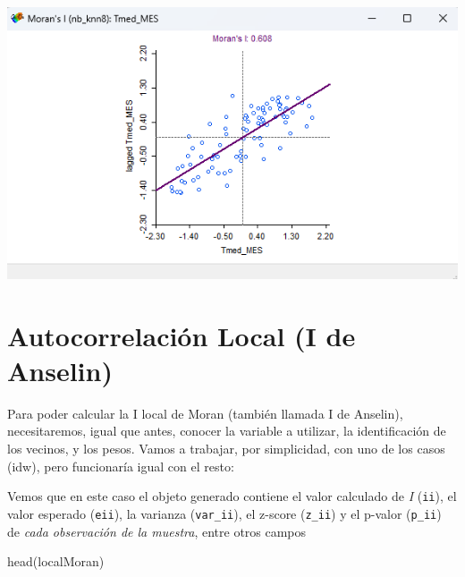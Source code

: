 \documentclass[
  letterpaper,
  DIV=11,
  numbers=noendperiod]{scrreprt}
\newenvironment{Shaded}{\begin{snugshade}}{\end{snugshade}}
\newcommand{\AttributeTok}[1]{\textcolor[rgb]{0.40,0.45,0.13}{#1}}
\newcommand{\FunctionTok}[1]{\textcolor[rgb]{0.28,0.35,0.67}{#1}}
\newcommand{\NormalTok}[1]{\textcolor[rgb]{0.00,0.23,0.31}{#1}}
\newcommand{\OtherTok}[1]{\textcolor[rgb]{0.00,0.23,0.31}{#1}}
\newcommand{\SpecialCharTok}[1]{\textcolor[rgb]{0.37,0.37,0.37}{#1}}
\begin{document}
\includegraphics{images/geoda_MoranI.png}

\hypertarget{autocorrelaciuxf3n-local-i-de-anselin}{%
\section{Autocorrelación Local (I de
Anselin)}\label{autocorrelaciuxf3n-local-i-de-anselin}}

Para poder calcular la I local de Moran (también llamada I de Anselin),
necesitaremos, igual que antes, conocer la variable a utilizar, la
identificación de los vecinos, y los pesos. Vamos a trabajar, por
simplicidad, con uno de los casos (idw), pero funcionaría igual con el
resto:

\begin{Shaded}
\end{Shaded}

Vemos que en este caso el objeto generado contiene el valor calculado de
\emph{I} (\texttt{ii}), el valor esperado (\texttt{eii}), la varianza
(\texttt{var\_ii}), el z-score (\texttt{z\_ii}) y el p-valor
(\texttt{p\_ii}) de \emph{cada observación de la muestra}, entre otros
campos

\begin{Shaded}
\begin{Highlighting}[]
\FunctionTok{head}\NormalTok{(localMoran)}
\end{Highlighting}
\end{Shaded}
\end{document}
